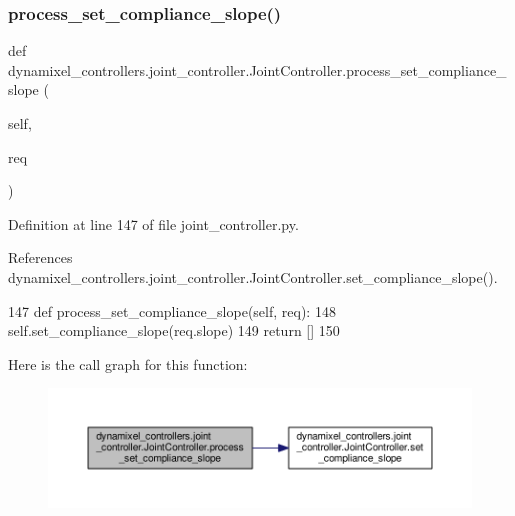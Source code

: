 \subsubsection{\texorpdfstring{process\+\_\+set\+\_\+compliance\+\_\+slope()}{process\_set\_compliance\_slope()}}
{\footnotesize\ttfamily def dynamixel\+\_\+controllers.\+joint\+\_\+controller.\+Joint\+Controller.\+process\+\_\+set\+\_\+compliance\+\_\+slope (\begin{DoxyParamCaption}\item[{}]{self,  }\item[{}]{req }\end{DoxyParamCaption})\hspace{0.3cm}{\ttfamily [inherited]}}



Definition at line 147 of file joint\+\_\+controller.\+py.



References dynamixel\+\_\+controllers.\+joint\+\_\+controller.\+Joint\+Controller.\+set\+\_\+compliance\+\_\+slope().


\begin{DoxyCode}
147     \textcolor{keyword}{def }process\_set\_compliance\_slope(self, req):
148         self.set\_compliance\_slope(req.slope)
149         \textcolor{keywordflow}{return} []
150 
\end{DoxyCode}
Here is the call graph for this function\+:
\nopagebreak
\begin{figure}[H]
\begin{center}
\leavevmode
\includegraphics[width=350pt]{d3/dcd/classdynamixel__controllers_1_1joint__controller_1_1_joint_controller_a6390c0c20afc0581dd3b1122c894d175_cgraph}
\end{center}
\end{figure}
\mbox{\label{classdynamixel__controllers_1_1joint__controller_1_1_joint_controller_a97af096c1566307859ed168c900fa8a6}} 
